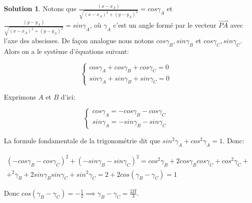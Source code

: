 \documentclass[10pt,a4paper]{article}%
\theoremstyle{theorem}
\theoremstyle{definition}
\newtheorem*{solution*}{Solution}
\begin{document}
\begin{solution*}
	        Notons que $\frac{(x-x_A)}{\sqrt{(x-x_A)^2+(y-y_A)^2}}=cos\gamma_A$ et $\frac{(y-y_A)}{\sqrt{(x-x_A)^2+(y-y_A)^2}}=sin \gamma_A$, 
	        où $\gamma_A$ c'est un angle formé par le vecteur $\overrightarrow{PA}$ avec l'axe des abscisses. De façon analogue nous notons $cos\gamma_B, sin\gamma_B$ et $cos\gamma_C, sin\gamma_C$.
	        Alors on a le système d'équations suivant:
	        
	        \begin{equation*}
		        \begin{cases}
		        	cos\gamma_A+cos\gamma_B+cos\gamma_C=0
		        	\\
		        	sin\gamma_A+sin\gamma_B+sin\gamma_C=0
		        \end{cases}
	        \end{equation*}
	        
	        Exprimons $A$ et $B$ d'ici:
	        
	        \begin{equation*}
	        	\begin{cases}
	        		cos\gamma_A=-cos\gamma_B-cos\gamma_C
	        		\\
	        		sin\gamma_A=-sin\gamma_B-sin\gamma_C
	        	\end{cases}
	        \end{equation*}
	        
	        La formule fondamentale de la trigonométrie dit que $sin^2\gamma_A+cos^2\gamma_A=1$. Donc:
	        
	        \begin{eqnarray*}
	        (-cos\gamma_B-cos\gamma_C)^2+(-sin\gamma_B-sin\gamma_C)^2=cos^2\gamma_B+2cos\gamma_Bcos\gamma_C+cos^2\gamma_C+
	        \\
	        +^2\gamma_B+2sin\gamma_Bsin\gamma_C+sin^2\gamma_C=2+2cos(\gamma_B-\gamma_C)=1
   			\end{eqnarray*}
	        
	        
	        Donc $cos(\gamma_B-\gamma_C)=-\frac{1}{2}  \implies  \gamma_B-\gamma_C=\frac{2\Pi}{3}$.
	        
	        \begin{figure}[h]
	        	\begin{center}
\end{center}
\end{figure}
\end{solution*}
\end{document}
